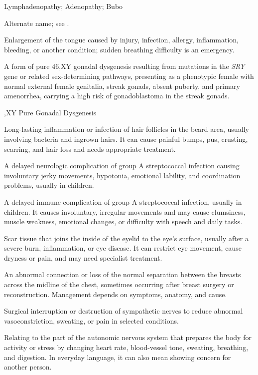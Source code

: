 \synonyms
Lymphadenopathy; Adenopathy; Bubo

 Alternate name; see .

 Enlargement of the tongue caused by injury, infection, allergy, inflammation, bleeding, or another condition; sudden breathing difficulty is an emergency.

 A form of pure 46,XY gonadal dysgenesis resulting from mutations in the \textit{SRY} gene or related sex-determining pathways, presenting as a phenotypic female with normal external female genitalia, streak gonads, absent puberty, and primary amenorrhea, carrying a high risk of gonadoblastoma in the streak gonads.

,XY Pure Gonadal Dysgenesis

 Long-lasting inflammation or infection of hair follicles in the beard area, usually involving bacteria and ingrown hairs. It can cause painful bumps, pus, crusting, scarring, and hair loss and needs appropriate treatment.

 A delayed neurologic complication of group A streptococcal infection causing involuntary jerky movements, hypotonia, emotional lability, and coordination problems, usually in children.

 A delayed immune complication of group A streptococcal infection, usually in children. It causes involuntary, irregular movements and may cause clumsiness, muscle weakness, emotional changes, or difficulty with speech and daily tasks.

 Scar tissue that joins the inside of the eyelid to the eye’s surface, usually after a severe burn, inflammation, or eye disease. It can restrict eye movement, cause dryness or pain, and may need specialist treatment.

 An abnormal connection or loss of the normal separation between the breasts across the midline of the chest, sometimes occurring after breast surgery or reconstruction. Management depends on symptoms, anatomy, and cause.

 Surgical interruption or destruction of sympathetic nerves to reduce abnormal vasoconstriction, sweating, or pain in selected conditions.

 Relating to the part of the autonomic nervous system that prepares the body for activity or stress by changing heart rate, blood-vessel tone, sweating, breathing, and digestion. In everyday language, it can also mean showing concern for another person.


